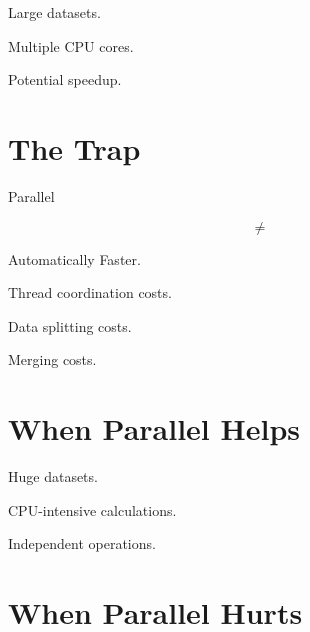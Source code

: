 \documentclass[11pt,a4paper]{book}
\begin{document}
Large datasets.


Multiple CPU cores.


Potential speedup.


\section{The Trap}

Parallel

\[
\neq
\]

Automatically Faster.


Thread coordination costs.


Data splitting costs.


Merging costs.


\section{When Parallel Helps}


Huge datasets.


CPU-intensive calculations.


Independent operations.


\section{When Parallel Hurts}

\end{document}
